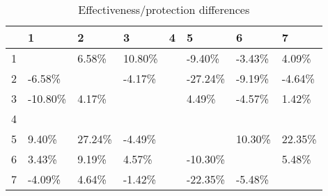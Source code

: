 \begin{table}[ht]
\centering
\begin{tabular}{rlllllll}
  \hline
 & 1 & 2 & 3 & 4 & 5 & 6 & 7 \\ 
  \hline
1 &  & 6.58\% & 10.80\% &  & -9.40\% & -3.43\% & 4.09\% \\ 
  2 & -6.58\% &  & -4.17\% &  & -27.24\% & -9.19\% & -4.64\% \\ 
  3 & -10.80\% & 4.17\% &  &  & 4.49\% & -4.57\% & 1.42\% \\ 
  4 &  &  &  &  &  &  &  \\ 
  5 & 9.40\% & 27.24\% & -4.49\% &  &  & 10.30\% & 22.35\% \\ 
  6 & 3.43\% & 9.19\% & 4.57\% &  & -10.30\% &  & 5.48\% \\ 
  7 & -4.09\% & 4.64\% & -1.42\% &  & -22.35\% & -5.48\% &  \\ 
   \hline
\end{tabular}
\caption{Effectiveness/protection differences} 
\end{table}
